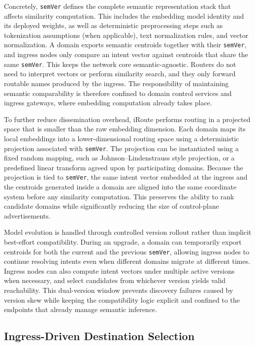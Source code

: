 \documentclass[conference]{IEEEtran}
\newcommand{\sysname}{iRoute}
\begin{document}
Concretely, \texttt{semVer} defines the complete semantic representation stack that affects similarity computation. This includes the embedding model identity and its deployed weights, as well as deterministic preprocessing steps such as tokenization assumptions (when applicable), text normalization rules, and vector normalization. A domain exports semantic centroids together with their \texttt{semVer}, and ingress nodes only compare an intent vector against centroids that share the same \texttt{semVer}. This keeps the network core semantic-agnostic. Routers do not need to interpret vectors or perform similarity search, and they only forward routable names produced by the ingress. The responsibility of maintaining semantic comparability is therefore confined to domain control services and ingress gateways, where embedding computation already takes place.

To further reduce dissemination overhead, \sysname{} performs routing in a projected space that is smaller than the raw embedding dimension. Each domain maps its local embeddings into a lower-dimensional routing space using a deterministic projection associated with \texttt{semVer}. The projection can be instantiated using a fixed random mapping, such as Johnson--Lindenstrauss style projection, or a predefined linear transform agreed upon by participating domains. Because the projection is tied to \texttt{semVer}, the same intent vector embedded at the ingress and the centroids generated inside a domain are aligned into the same coordinate system before any similarity computation. This preserves the ability to rank candidate domains while significantly reducing the size of control-plane advertisements.

Model evolution is handled through controlled version rollout rather than implicit best-effort compatibility. During an upgrade, a domain can temporarily export centroids for both the current and the previous \texttt{semVer}, allowing ingress nodes to continue resolving intents even when different domains migrate at different times. Ingress nodes can also compute intent vectors under multiple active versions when necessary, and select candidates from whichever version yields valid reachability. This dual-version window prevents discovery failures caused by version skew while keeping the compatibility logic explicit and confined to the endpoints that already manage semantic inference.

\subsection{Ingress-Driven Destination Selection}
\label{sec:design_forwarding}
\end{document}
